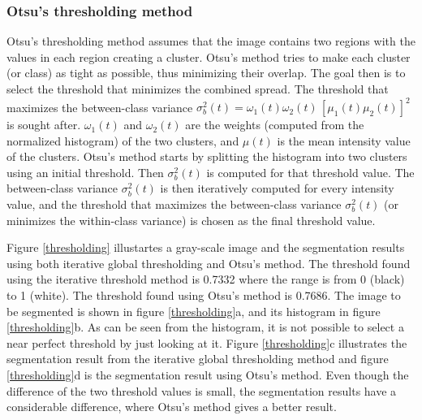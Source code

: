 \subsubsection{Otsu's thresholding method}
Otsu's thresholding method assumes that the image contains two regions with the values in each region creating a cluster. Otsu's method tries to make each cluster (or class) as tight as possible, thus minimizing their overlap. The goal then is to select the threshold that minimizes the combined spread. The threshold that maximizes the between-class variance \(\sigma_{b}^2(t) = \omega_{1}(t)\omega_{2}(t)\,[\mu_{1}(t)\mu_{2}(t)]^2\) is sought after. \(\omega_{1}(t)\) and \(\omega_{2}(t)\) are the weights (computed from the normalized histogram) of the two clusters, and \(\mu(t)\) is the mean intensity value of the clusters. Otsu's method starts by splitting the histogram into two clusters using an initial threshold. Then \(\sigma_{b}^2(t)\) is computed for that threshold value. The between-class variance \(\sigma_{b}^2(t)\) is then iteratively computed for every intensity value, and the threshold that maximizes the between-class variance \(\sigma_{b}^2(t)\) (or minimizes the within-class variance) is chosen as the final threshold value.

Figure \ref{thresholding} illustartes a gray-scale image and the segmentation results using both iterative global thresholding and Otsu's method. The threshold found using the iterative threshold method is 0.7332 where the range is from 0 (black) to 1 (white). The threshold found using Otsu's method is 0.7686. The image to be segmented is shown in figure \ref{thresholding}a, and its histogram in figure \ref{thresholding}b. As can be seen from the histogram, it is not possible to select a near perfect threshold by just looking at it. Figure \ref{thresholding}c illustrates the segmentation result from the iterative global thresholding method and figure \ref{thresholding}d is the segmentation result using Otsu's method. Even though the difference of the two threshold values is small, the segmentation results have a considerable difference, where Otsu's method gives a better result.

